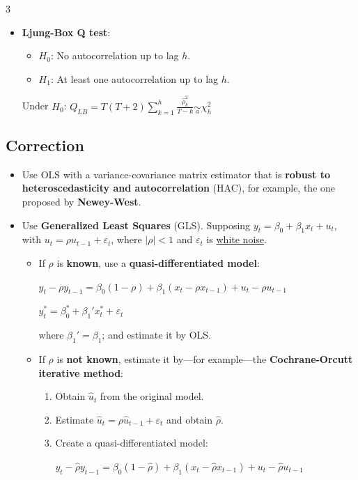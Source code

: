 \documentclass[10pt, a4paper, landscape]{article}
\begin{document}
\begin{multicols}{3}
\begin{itemize}[leftmargin=*]
	\item \textbf{Ljung-Box Q test}:
	\begin{itemize}[leftmargin=*]
		\item \( H_{0} \): No autocorrelation up to lag \( h \).
		\item \( H_{1} \): At least one autocorrelation up to lag \( h \).
	\end{itemize}
	\begin{center}
		Under \( H_{0} \): \quad \( Q_{LB} = T (T + 2) \sum_{k = 1}^{h} \frac{\hat{\rho}_{k}^{2}}{T - k} \underset{a}{\sim} \chi_{h}^{2} \)
	\end{center}
\end{itemize}

\columnbreak

\subsection*{Correction}

\begin{itemize}[leftmargin=*]
	\item Use OLS with a variance-covariance matrix estimator that is \textbf{robust to heteroscedasticity and autocorrelation} (HAC), for example, the one proposed by \textbf{Newey-West}.
	\item Use \textbf{Generalized Least Squares} (GLS). Supposing \( y_{t} = \beta_{0} + \beta_{1} x_{t} + u_{t} \), with \( u_{t} = \rho u_{t - 1} + \varepsilon_{t} \), where \( \lvert \rho \rvert < 1 \) and \( \varepsilon_{t} \) is \underline{white noise}.
	\begin{itemize}[leftmargin=*]
		\item If \( \rho \) is \textbf{known}, use a \textbf{quasi-differentiated model}:
		\begin{center}
			\( y_{t} - \rho y_{t - 1}= \beta_{0} (1 - \rho) + \beta_{1} (x_{t} - \rho x_{t - 1}) + u_{t} - \rho u_{t - 1} \)

			\( y_{t}^{*} = \beta_{0}^{*} + \beta_{1}' x_{t}^{*} + \varepsilon_{t} \)
		\end{center}
		where \( \beta_{1}' = \beta_{1} \); and estimate it by OLS.
		\item If \( \rho \) is \textbf{not known}, estimate it by---for example---the \textbf{Cochrane-Orcutt iterative method}:
		\begin{enumerate}[leftmargin=*]
			\item Obtain \( \hat{u}_{t} \) from the original model.
			\item Estimate \( \hat{u}_{t} = \rho \hat{u}_{t - 1} + \varepsilon_{t} \) and obtain \( \hat{\rho} \).
			\item Create a quasi-differentiated model:
			\begin{center}
				\( y_{t} - \hat{\rho}y_{t - 1} = \beta_{0} (1 - \hat{\rho}) + \beta_{1} (x_{t} - \hat{\rho} x_{t - 1}) + u_{t} - \hat{\rho}u_{t - 1} \)


\end{center}
\end{enumerate}
\end{itemize}
\end{itemize}
\end{multicols}
\end{document}
